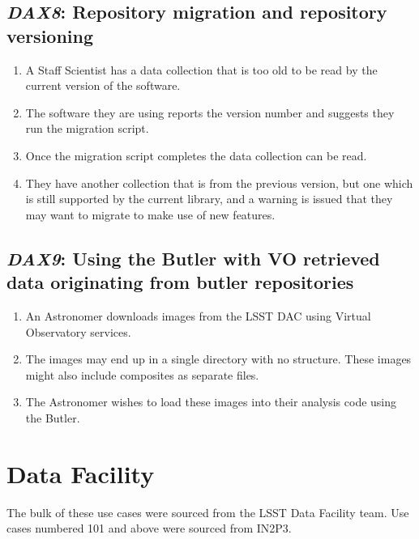 \documentclass[DM,toc,lsstdraft]{lsstdoc}
\newcommand{\usecase}[3]{%
\subsection{\emph{#1}: #2}
\label{use:#1}
\begin{enumerate}[label=\alph*.]
#3
\end{enumerate}
}
\begin{document}
\usecase{DAX8}{Repository migration and repository versioning}{%

\item
A Staff Scientist has a data collection that is too old to be read by the current version of the software.

\item
The software they are using reports the version number and suggests they run the migration script.

\item
Once the migration script completes the data collection can be read.

\item
They have another collection that is from the previous version, but one which is still supported by the current library, and a warning is issued that they may want to migrate to make use of new features.

}

\usecase{DAX9}{Using the Butler with VO retrieved data originating from butler repositories}{%

\item
An Astronomer downloads images from the LSST DAC using Virtual Observatory services.

\item
The images may end up in a single directory with no structure.
These images might also include composites as separate files.

\item
The Astronomer wishes to load these images into their analysis code using the Butler.

}

\section{Data Facility}

The bulk of these use cases were sourced from the LSST Data Facility team.
Use cases numbered 101 and above were sourced from IN2P3.
\end{document}
